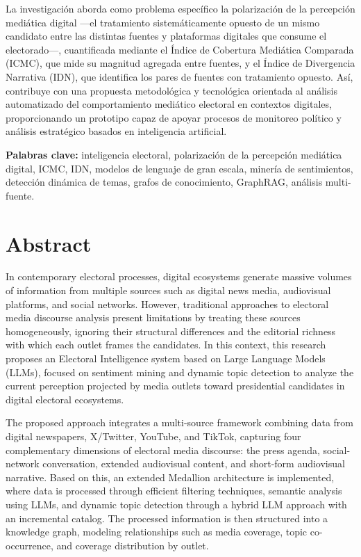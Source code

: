 La investigación aborda como problema específico la polarización de la percepción mediática digital —el tratamiento sistemáticamente opuesto de un mismo candidato entre las distintas fuentes y plataformas digitales que consume el electorado—, cuantificada mediante el Índice de Cobertura Mediática Comparada (ICMC), que mide su magnitud agregada entre fuentes, y el Índice de Divergencia Narrativa (IDN), que identifica los pares de fuentes con tratamiento opuesto. Así, contribuye con una propuesta metodológica y tecnológica orientada al análisis automatizado del comportamiento mediático electoral en contextos digitales, proporcionando un prototipo capaz de apoyar procesos de monitoreo político y análisis estratégico basados en inteligencia artificial.

\textbf{Palabras clave:} inteligencia electoral, polarización de la percepción mediática digital, ICMC, IDN, modelos de lenguaje de gran escala, minería de sentimientos, detección dinámica de temas, grafos de conocimiento, GraphRAG, análisis multi-fuente.
\clearpage

\chapter*{Abstract}
{}

In contemporary electoral processes, digital ecosystems generate massive volumes of information from multiple sources such as digital news media, audiovisual platforms, and social networks. However, traditional approaches to electoral media discourse analysis present limitations by treating these sources homogeneously, ignoring their structural differences and the editorial richness with which each outlet frames the candidates. In this context, this research proposes an Electoral Intelligence system based on Large Language Models (LLMs), focused on sentiment mining and dynamic topic detection to analyze the current perception projected by media outlets toward presidential candidates in digital electoral ecosystems.

The proposed approach integrates a multi-source framework combining data from digital newspapers, X/Twitter, YouTube, and TikTok, capturing four complementary dimensions of electoral media discourse: the press agenda, social-network conversation, extended audiovisual content, and short-form audiovisual narrative. Based on this, an extended Medallion architecture is implemented, where data is processed through efficient filtering techniques, semantic analysis using LLMs, and dynamic topic detection through a hybrid LLM approach with an incremental catalog. The processed information is then structured into a knowledge graph, modeling relationships such as media coverage, topic co-occurrence, and coverage distribution by outlet.

